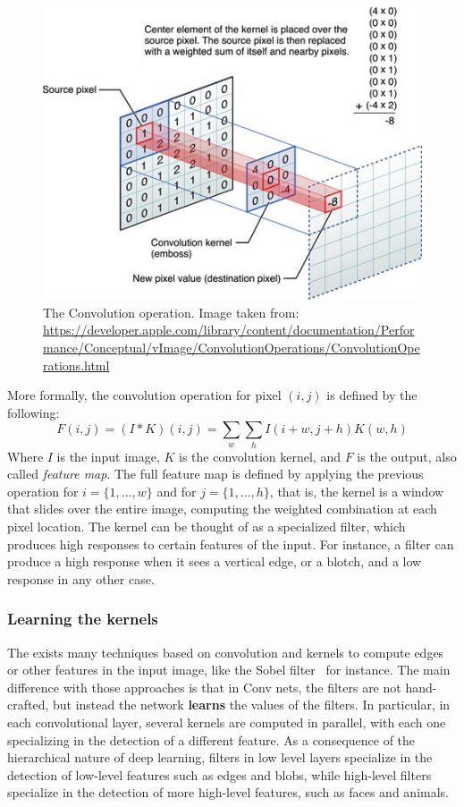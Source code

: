 \documentclass[../main.tex]{subfiles}
\begin{document}
    \begin{figure}[h!]
        \centering
    	\includegraphics[width=.8\linewidth]{img/convolution-op.png}
        \caption{The Convolution operation. Image taken from: \url{https://developer.apple.com/library/content/documentation/Performance/Conceptual/vImage/ConvolutionOperations/ConvolutionOperations.html}}\label{fig:convolution-op}
	\end{figure}

    More formally, the convolution operation for pixel $(i, j)$ is defined by the following:
    \begin{equation}
        F(i, j) = (I \ast K)(i, j) = \sum_{w} \sum_{h} I(i + w, j + h) K(w, h)
    \end{equation}
    Where $I$ is the input image, $K$ is the convolution kernel, and $F$ is the output, also called \textit{feature map}. The full
    feature map is defined by applying the previous operation for $i = \{1, \ldots, w\}$ and for $j = \{1, \ldots, h\}$, that is, the kernel
    is a window that slides over the entire image, computing the weighted combination at each pixel location. The kernel can be thought
    of as a specialized filter, which produces high responses to certain features of the input. For instance, a filter can produce a
    high response when it sees a vertical edge, or a blotch, and a low response in any other case.

    \subsubsection{Learning the kernels}
    The exists many techniques based on convolution and kernels to compute edges or other features in the input image, like the Sobel
	filter~\cite{gao2010improved} for instance.
    The main difference with those approaches is that in Conv nets, the filters are not hand-crafted, but instead the network \textbf{learns}
    the values of the filters. In particular, in each convolutional layer, several kernels are computed in parallel, with each one specializing
    in the detection of a different feature. As a consequence of the hierarchical nature of deep learning, filters in low level layers specialize
    in the detection of low-level features such as edges and blobs, while high-level filters specialize in the detection of more high-level features,
    such as faces and animals.
\end{document}
